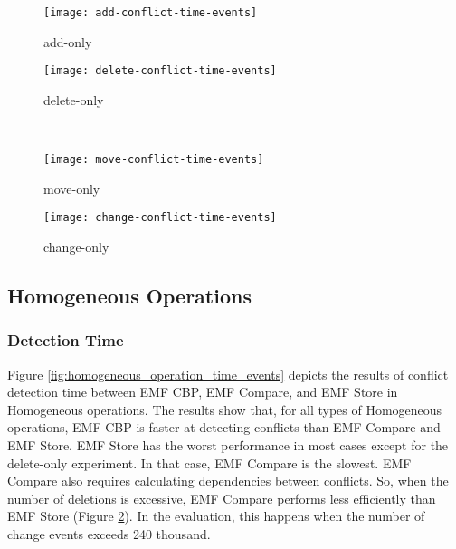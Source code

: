 \begin{figure*}[ht]
  \centering
  \begin{subfigure}[t]{0.490\linewidth}
    \texttt{[image: add-conflict-time-events]}
    \caption{add-only}
    \label{fig:add-conflict-time-events}
  \end{subfigure}
  \hfill
  \begin{subfigure}[t]{0.490\linewidth}
    \texttt{[image: delete-conflict-time-events]}
    \caption{delete-only}
    \label{fig:delete-conflict-time-events}
  \end{subfigure}
  \\
  \begin{subfigure}[t]{0.490\linewidth}
    \texttt{[image: move-conflict-time-events]}
    \caption{move-only}
    \label{fig:move-conflict-time-events}
  \end{subfigure}
  \hfill
  \begin{subfigure}[t]{0.490\linewidth}
    \texttt{[image: change-conflict-time-events]}
    \caption{change-only}
    \label{fig:change-conflict-time-events}
  \end{subfigure}
  \caption{Conflict detection time for homogeneous operations.}
  \label{fig:homogeneous_operation_time_events}
\end{figure*}

\subsection{Homogeneous Operations}
\label{sec:Homogeneous-operation_conflict}

\subsubsection{Detection Time}
\label{sec:detection_time}
Figure \ref{fig:homogeneous_operation_time_events} depicts the results of conflict detection time between EMF CBP, EMF Compare, and EMF Store in Homogeneous operations. The results show that, for all types of Homogeneous operations, EMF CBP is faster at detecting conflicts than EMF Compare and EMF Store. EMF Store has the worst performance in most cases except for the delete-only experiment. In that case, EMF Compare is the slowest. EMF Compare also requires calculating dependencies between conflicts. So, when the number of deletions is excessive, EMF Compare performs less efficiently than EMF Store (Figure \ref{fig:delete-conflict-time-events}). In the evaluation, this happens when the number of change events exceeds 240 thousand.

